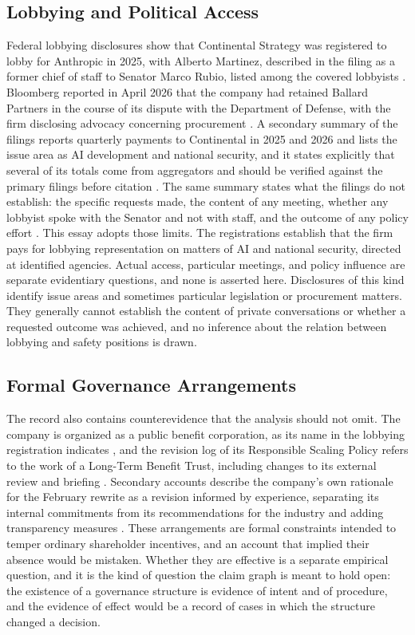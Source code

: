 \documentclass[12pt]{article}
\theoremstyle{definition}
\theoremstyle{remark}
\begin{document}
\subsection{Lobbying and Political Access}

Federal lobbying disclosures show that Continental Strategy was registered to lobby for Anthropic in 2025, with Alberto Martinez, described in the filing as a former chief of staff to Senator Marco Rubio, listed among the covered lobbyists \cite{lda}. Bloomberg reported in April 2026 that the company had retained Ballard Partners in the course of its dispute with the Department of Defense, with the firm disclosing advocacy concerning procurement \cite{bloomberg2026}. A secondary summary of the filings reports quarterly payments to Continental in 2025 and 2026 and lists the issue area as AI development and national security, and it states explicitly that several of its totals come from aggregators and should be verified against the primary filings before citation \cite{explainx2026}. The same summary states what the filings do not establish: the specific requests made, the content of any meeting, whether any lobbyist spoke with the Senator and not with staff, and the outcome of any policy effort \cite{explainx2026}. This essay adopts those limits. The registrations establish that the firm pays for lobbying representation on matters of AI and national security, directed at identified agencies. Actual access, particular meetings, and policy influence are separate evidentiary questions, and none is asserted here. Disclosures of this kind identify issue areas and sometimes particular legislation or procurement matters. They generally cannot establish the content of private conversations or whether a requested outcome was achieved, and no inference about the relation between lobbying and safety positions is drawn.

\subsection{Formal Governance Arrangements}

The record also contains counterevidence that the analysis should not omit. The company is organized as a public benefit corporation, as its name in the lobbying registration indicates \cite{lda}, and the revision log of its Responsible Scaling Policy refers to the work of a Long-Term Benefit Trust, including changes to its external review and briefing \cite{vorp2026}. Secondary accounts describe the company's own rationale for the February rewrite as a revision informed by experience, separating its internal commitments from its recommendations for the industry and adding transparency measures \cite{startuphub2026}. These arrangements are formal constraints intended to temper ordinary shareholder incentives, and an account that implied their absence would be mistaken. Whether they are effective is a separate empirical question, and it is the kind of question the claim graph is meant to hold open: the existence of a governance structure is evidence of intent and of procedure, and the evidence of effect would be a record of cases in which the structure changed a decision.
\end{document}
